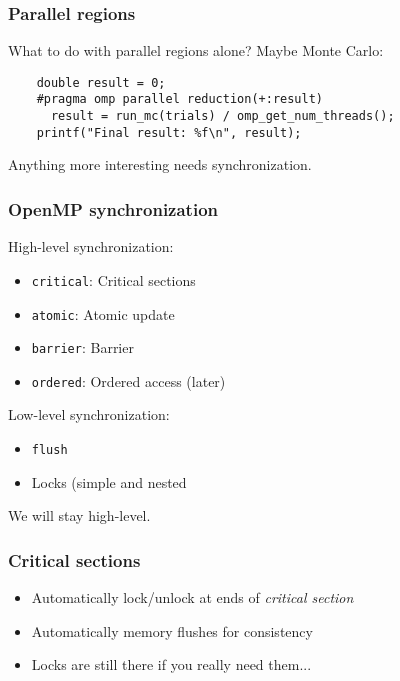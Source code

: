 \documentclass{beamer}
\begin{document}
\begin{frame}[fragile]
  \frametitle{Parallel regions}

  What to do with parallel regions alone?  Maybe Monte Carlo:
  \begin{lstlisting}
    double result = 0;
    #pragma omp parallel reduction(+:result)
      result = run_mc(trials) / omp_get_num_threads();
    printf("Final result: %f\n", result);
  \end{lstlisting}
  Anything more interesting needs synchronization.
\end{frame}


\begin{frame}
  \frametitle{OpenMP synchronization}

  High-level synchronization:
  \begin{itemize}
  \item {\tt critical}: Critical sections
  \item {\tt atomic}: Atomic update
  \item {\tt barrier}: Barrier
  \item {\tt ordered}: Ordered access (later)
  \end{itemize}
  Low-level synchronization:
  \begin{itemize}
  \item {\tt flush}
  \item Locks (simple and nested
  \end{itemize}
  We will stay high-level.
  
\end{frame}

\begin{frame}
  \frametitle{Critical sections}

  \begin{center}
  \end{center}

  \begin{itemize}
  \item Automatically lock/unlock at ends of {\em critical section}
  \item Automatically memory flushes for consistency
  \item Locks are still there if you really need them...
  \end{itemize}
\end{frame}
\end{document}

